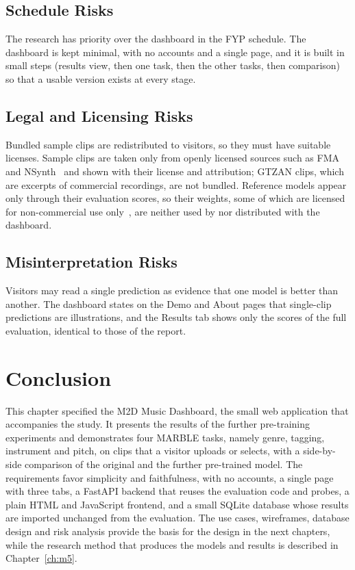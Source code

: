 \documentclass{FastFyp}
\begin{document}
\subsection{Schedule Risks}
The research has priority over the dashboard in the FYP schedule. The dashboard is kept minimal, with no accounts and a single page, and it is built in small steps (results view, then one task, then the other tasks, then comparison) so that a usable version exists at every stage.

\subsection{Legal and Licensing Risks}
Bundled sample clips are redistributed to visitors, so they must have suitable licenses. Sample clips are taken only from openly licensed sources such as FMA~\cite{ref:Defferrard:2017fma} and NSynth~\cite{ref:Engel:2017nsynth} and shown with their license and attribution; GTZAN clips, which are excerpts of commercial recordings, are not bundled. Reference models appear only through their evaluation scores, so their weights, some of which are licensed for non-commercial use only~\cite{ref:MERTCard}, are neither used by nor distributed with the dashboard.

\subsection{Misinterpretation Risks}
Visitors may read a single prediction as evidence that one model is better than another. The dashboard states on the Demo and About pages that single-clip predictions are illustrations, and the Results tab shows only the scores of the full evaluation, identical to those of the report.



\FloatBarrier
\section{Conclusion}
\label{sec:srs-conclusion}
This chapter specified the M2D Music Dashboard, the small web application that accompanies the study. It presents the results of the further pre-training experiments and demonstrates four MARBLE tasks, namely genre, tagging, instrument and pitch, on clips that a visitor uploads or selects, with a side-by-side comparison of the original and the further pre-trained model. The requirements favor simplicity and faithfulness, with no accounts, a single page with three tabs, a FastAPI backend that reuses the evaluation code and probes, a plain HTML and JavaScript frontend, and a small SQLite database whose results are imported unchanged from the evaluation. The use cases, wireframes, database design and risk analysis provide the basis for the design in the next chapters, while the research method that produces the models and results is described in Chapter~\ref{ch:m5}.
\end{document}
